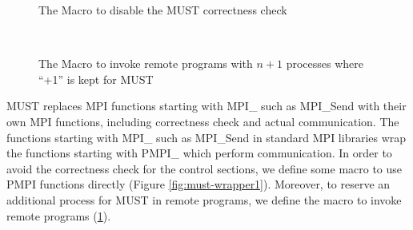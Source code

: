 \documentclass[graybox]{svmult}
\begin{document}
\begin{figure}[t]
\begin{center}
\caption{The Macro to disable the MUST correctness check}
\label{fig:must-wrapper1}
~\\
\caption{The Macro to invoke remote programs with $n+1$ processes where ``+1'' is kept for MUST}
\label{fig:must-wrapper2}
\end{center}
\end{figure}

MUST replaces MPI functions starting with MPI\_ such as MPI\_Send with their own MPI functions, including correctness check and actual communication. 
The functions starting with MPI\_ such as MPI\_Send in standard MPI libraries wrap the functions starting with PMPI\_ which perform communication. 
In order to avoid the correctness check for the control sections, we define some macro to use PMPI functions directly (Figure \ref{fig:must-wrapper1}). Moreover, to reserve an additional process for MUST in remote programs, we define the macro to invoke remote programs (\ref{fig:must-wrapper2}). 
\end{document}
